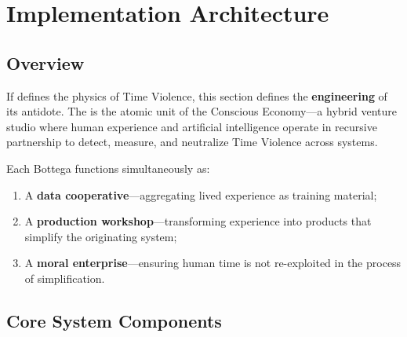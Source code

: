 
\section{Implementation Architecture}
\label{sec:implementation}

\subsection{Overview}
\label{sec:impl-overview}

If  defines the physics of Time Violence, this section defines the \textbf{engineering} of its antidote. The  is the atomic unit of the Conscious Economy—a hybrid venture studio where human experience and artificial intelligence operate in recursive partnership to detect, measure, and neutralize Time Violence across systems.

Each Bottega functions simultaneously as:
\begin{enumerate}
    \item A \textbf{data cooperative}—aggregating lived experience as training material;
    \item A \textbf{production workshop}—transforming experience into products that simplify the originating system;
    \item A \textbf{moral enterprise}—ensuring human time is not re-exploited in the process of simplification.
\end{enumerate}

\subsection{Core System Components}
\label{sec:system-components}

